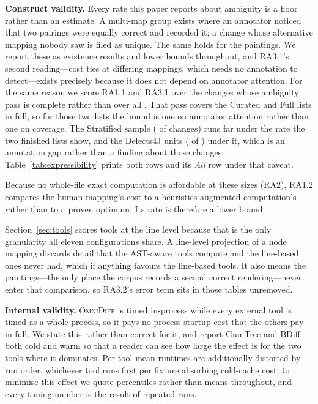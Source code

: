 \documentclass[sigconf]{acmart}
\begin{document}
\textbf{Construct validity.} Every rate this paper reports about ambiguity is a floor rather than
an estimate. A multi-map group exists where an annotator noticed that two pairings were equally
correct and recorded it; a change whose alternative mapping nobody saw is filed as unique. The
same holds for the paintings. We report these as existence results and lower bounds throughout, and RA3.1's second reading---cost ties at differing mappings, which needs no annotation to detect---exists precisely because it does not depend on annotator attention. For the same reason we score RA1.1 and RA3.1 over the \AmbiguityListScored{} changes whose ambiguity pass is complete rather than over all \NumFixtures{}. That pass covers the Curated and Full lists in full, so for those two lists the bound is one on annotator attention rather than one on coverage. The Stratified sample (\AmbiguityStratifiedWith{} of \AmbiguityStratifiedTotal{} changes) runs far under the rate the two finished lists show, and the Defects4J units (\AmbiguityDefectsFourJWith{} of \AmbiguityDefectsFourJTotal{}) under it, which is an annotation gap rather than a finding about those changes; Table~\ref{tab:expressibility} prints both rows and its \emph{All} row under that caveat.

Because no whole-file exact computation is affordable at these sizes (RA2), RA1.2 compares the
human mapping's cost to a heuristics-augmented computation's rather than to a proven optimum. Its
rate is therefore a lower bound.

Section~\ref{sec:tools} scores tools at the line level because that is the only granularity all
eleven configurations share. A line-level projection of a node mapping discards detail that the
AST-aware tools compute and the line-based ones never had, which if anything favours the
line-based tools. It also means the paintings---the only place the corpus records a second correct
rendering---never enter that comparison, so RA3.2's error term sits in those tables unremoved.

\textbf{Internal validity.} \textsc{OmniDiff} is timed in-process while every external tool is
timed as a whole process, so it pays no process-startup cost that the others pay in full. We state
this rather than correct for it, and report GumTree and BDiff both cold and warm so that a reader
can see how large the effect is for the two tools where it dominates. Per-tool mean runtimes are
additionally distorted by run order, whichever tool runs first per fixture absorbing cold-cache
cost; to minimise this effect we quote percentiles rather than means throughout, and every timing number is the result of repeated runs.
\end{document}
